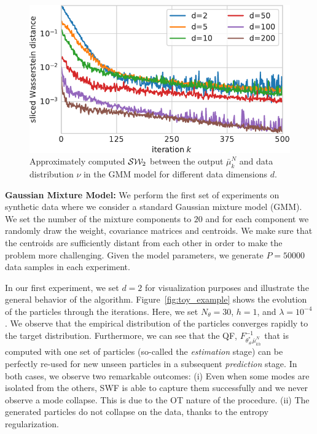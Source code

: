 
\begin{figure}
\vspace{-10pt}
\begin{centering}
\includegraphics[width=0.40\columnwidth]{figures/SW2_cost-crop.pdf}
\par\end{centering}
\caption{Approximately computed ${\cal S}{\cal W}_2$ between the output $\bar{\mu}_{k}^{N}$ and data distribution $\nu$ in the GMM model for different data dimensions $d$.
\label{fig:toy_sw}}
\vspace{-10pt}
\end{figure}
\textbf{Gaussian Mixture Model: }
We perform the first set of experiments on synthetic data where we consider a standard Gaussian mixture model (GMM).
%
We set the number of the mixture components to $20$ and for each component we randomly draw the weight, covariance matrices and centroids. We make sure that the centroids are sufficiently distant from each other in order to make the problem more challenging. Given the model parameters, we generate $P=50000$ data samples in each experiment.


In our first experiment, we set $d=2$ for visualization purposes and illustrate the general behavior of the algorithm. Figure~\ref{fig:toy_example} shows the evolution of the particles through the iterations. Here, we set $N_\theta=30$, $h=1$, and $\lambda=10^{-4}$.
%
We observe that the empirical distribution of the particles converges rapidly to the target distribution. Furthermore, we can see that the QF, $F^{-1}_{\theta^*_\#\bar{\mu}_{kh}^{N}}$ that is computed with one set of particles (so-called the \textit{estimation} stage) can be perfectly re-used for new unseen particles in a subsequent \textit{prediction} stage. In both cases, we observe two remarkable outcomes: (i) Even when some modes are isolated from the others, SWF is able to capture them successfully and we never observe a mode collapse. This is due to the OT nature of the procedure. (ii) The generated particles do not collapse on the data, thanks to the entropy regularization.

